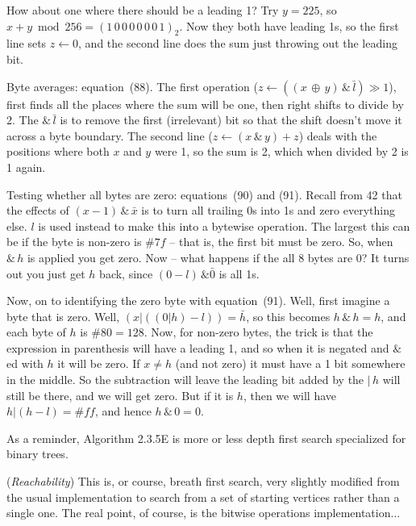 How about one where there should be a leading 1?
Try $y = 225$, so $x + y \bmod 256 = \left(1\,0\,0\,0\,0\,0\,0\,1\right)_2$.
Now they both have leading 1s, so the first line sets $z \gets 0$,
and the second line does the sum just throwing out the leading bit.

\vskip 0.08in \noindent [p 151] Byte averages: equation~(88).\hfil\break
The first operation ($z \gets \left(\left( x \, \oplus \, y \right) \, \& \, \bar l
\right) \gg 1$), first finds all the places where the sum will be one,
then right shifts to divide by 2.  The $\&\,\bar l$ is to remove the
first (irrelevant) bit so that the shift doesn't move it across a byte
boundary.  The second line ($z \gets \left(x\,\&\,y\right) + z$)
deals with the positions where both $x$ and $y$ were 1,
so the sum is 2, which when divided by 2 is 1 again.

\vskip 0.08in \noindent [p 152] Testing whether all bytes are zero: 
equations~(90) and (91). \hfil\break 
Recall from 42 that the effects of $\left(x - 1\right) \, \& \, \bar x$
is to turn all trailing 0s into 1s and zero everything else.  $l$
is used instead to make this into a bytewise operation.  The
largest this can be if the byte is non-zero is $\#7f$ -- that is, the 
first bit must be zero. So, when $\& \, h$ is applied you get zero.
Now -- what happens if the all 8 bytes are 0?  It turns out you
just get $h$ back, since $\left(0 - l\right) \, \& \bar 0$ is all 1s.

Now, on to identifying the zero byte with equation~(91).
Well, first imagine a byte that is zero.  Well,
$\left(x | \left(\left(0 | h\right) - l \right)\right) = \bar h$,
so this becomes $h \, \& \, h = h$, and each byte of $h$
is $\#80 = 128$.  Now, for non-zero bytes, the trick
is that the expression in parenthesis will have a leading 1,
and so when it is negated and $\&$ed with $h$ it will be zero.
If $x \neq h$ (and not zero) it must have a 1 bit somewhere
in the middle.  So the subtraction will leave the leading bit
added by the $|\,h$ will still be there, and we will get zero.
But if it is $h$, then we will have $h | \left(h - l\right) = \#ff$,
and hence $h \, \& \,0 = 0$.

\vskip 0.1in 

\noindent [p 159] As a reminder, Algorithm 2.3.5E is more or
less depth first search specialized for binary trees.

\vskip 0.08in  ({\it Reachability})\hfil\break
This is, or course, breath first search, very slightly modified from
the usual implementation to search from a set of starting vertices
rather than a single one.  The real point, of course, is the bitwise
operations implementation...

